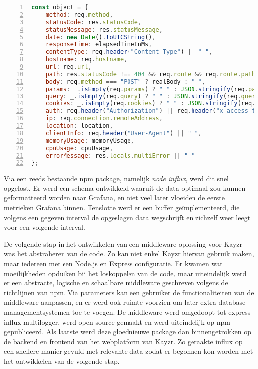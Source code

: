 \begin{lstlisting}[language=JavaScript, breaklines=true, numbers=left, frame=single, caption={Log object},label=code:multilogLogObject]
const object = {
	method: req.method,
	statusCode: res.statusCode,
	statusMessage: res.statusMessage,
	date: new Date().toUTCString(),
	responseTime: elapsedTimeInMs,
	contentType: req.header("Content-Type") || " ",
	hostname: req.hostname,
	url: req.url,
	path: res.statusCode !== 404 && req.route && req.route.path ? req.route.path : "No Path",
	body: req.method === "POST" ? realBody : " ",
	params: _.isEmpty(req.params) ? " " : JSON.stringify(req.params),
	query: _.isEmpty(req.query) ? " " : JSON.stringify(req.query),
	cookies: _.isEmpty(req.cookies) ? " " : JSON.stringify(req.cookies),
	auth: req.header("Authorization") || req.header("x-access-token") || " ",
	ip: req.connection.remoteAddress,
	location: location,
	clientInfo: req.header("User-Agent") || " ",
	memoryUsage: memoryUsage,
	cpuUsage: cpuUsage,
	errorMessage: res.locals.multiError || " "
};

\end{lstlisting}

Via een reeds bestaande npm package, namelijk \href{https://github.com/node-influx/node-influx}{\textit{node influx}}, werd dit snel opgelost. Er werd een schema ontwikkeld waaruit de data optimaal zou kunnen geformatteerd worden naar Grafana, en niet veel later vloeiden de eerste metrieken Grafana binnen. Tenslotte werd er een buffer geïmplementeerd, die volgens een gegeven interval de opgeslagen data wegschrijft en zichzelf weer leegt voor een volgende interval. 

De volgende stap in het ontwikkelen van een middleware oplossing voor Kayzr was het abstraheren van de code. Zo kan niet enkel Kayzr hiervan gebruik maken, maar iedereen met een Node.js en Express configuratie. Er kwamen wat moeilijkheden opduiken bij het loskoppelen van de code, maar uiteindelijk werd er een abstracte, logische en schaalbare middleware geschreven volgens de richtlijnen van npm. Via parameters kan een gebruiker de functionaliteiten van de middleware aanpassen, en er werd ook ruimte voorzien om later extra database managementsystemen toe te voegen. De middleware werd omgedoopt tot express-influx-multilogger, werd open source gemaakt en werd uiteindelijk op npm gepubliceerd. Als laatste werd deze gloednieuwe package dan binnengetrokken op de backend en frontend van het webplatform van Kayzr. Zo geraakte influx op een snellere manier gevuld met relevante data zodat er begonnen kon worden met het ontwikkelen van de volgende stap. 

